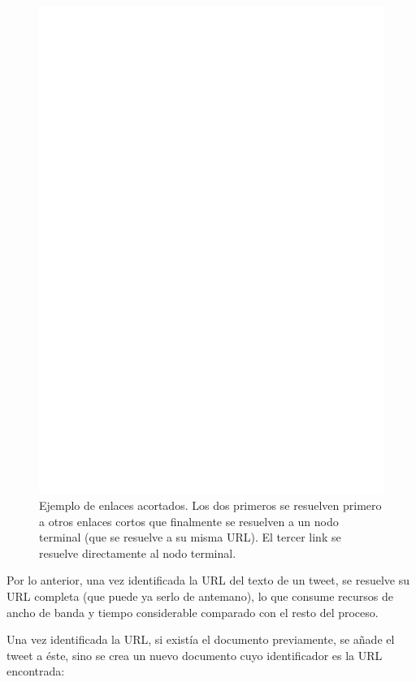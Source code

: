   \begin{figure}[h]
  \centering
  \includegraphics[width=16cm]{./dia/shortlinks.ps}
  \caption[Ejemplo de enlaces acortados.]
   {Ejemplo de enlaces acortados. Los dos primeros se resuelven
  primero a otros enlaces cortos que finalmente se resuelven a un
  nodo terminal (que se resuelve a su misma URL). El tercer link se
  resuelve directamente al nodo terminal.\label{fig:short}}
  \end{figure}

    Por lo anterior, una vez identificada la URL del texto de un
    tweet, se resuelve su URL completa (que puede ya serlo de
    antemano), lo que consume recursos de ancho de banda y
    tiempo considerable comparado con el resto del proceso.

    Una vez identificada la URL, si existía el documento previamente,
    se añade el tweet a éste, sino se crea un nuevo documento cuyo
    identificador es la URL encontrada:


